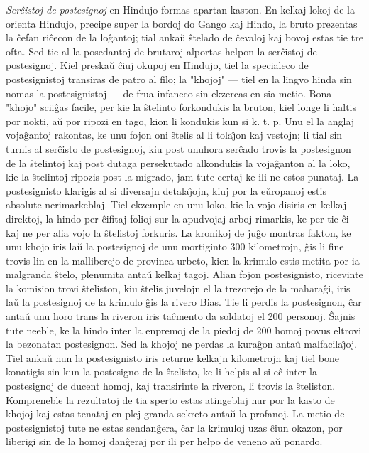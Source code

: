 \emph{Ser\^cistoj de postesignoj} en Hindujo formas apartan kaston.
En kelkaj lokoj de la orienta Hindujo, precipe super la bordoj do
Gango kaj Hindo, la bruto prezentas la \^cefan ri\^cecon de la
lo\^gantoj; tial anka\u u \^stelado de \^cevaloj kaj bovoj estas tie
tre ofta. Sed tie al la posedantoj de brutaroj alportas helpon la
ser\^cistoj de postesignoj. Kiel preska\u u \^ciuj okupoj en
Hindujo, tiel la specialeco de postesignistoj transiras de patro al
filo; la "khojoj" --- tiel en la lingvo hinda sin nomas la
postesignistoj --- de frua infaneco sin ekzercas en sia metio. Bona
"khojo" scii\^gas facile, per kie la \^stelinto forkondukis la
bruton, kiel longe li haltis por nokti, a\u u por ripozi en tago,
kion li kondukis kun si k. t. p. Unu el la anglaj voja\^gantoj
rakontas, ke unu fojon oni \^stelis al li tola\^{\j}on kaj vestojn;
li tial sin turnis al ser\^cisto de postesignoj, kiu post unuhora
ser\^cado trovis la postesignon de la \^stelintoj kaj post dutaga
persekutado alkondukis la voja\^ganton al la loko, kie la
\^stelintoj ripozis post la migrado, jam tute certaj ke ili ne estos
punataj. La postesignisto klarigis al si diversajn detala\^{\j}ojn,
kiuj por la e\u uropanoj estis absolute nerimarkeblaj. Tiel ekzemple
en unu loko, kie la vojo disiris en kelkaj direktoj, la hindo per
\^cifitaj folioj sur la apudvojaj arboj rimarkis, ke per tie \^ci
kaj ne per alia vojo la \^stelistoj forkuris. La kronikoj de ju\^go
montras fakton, ke unu khojo iris la\u u la postesignoj de unu
mortiginto 300 kilometrojn, \^gis li fine trovis lin en la
malliberejo de provinca urbeto, kien la krimulo estis metita por ia
malgranda \^stelo, plenumita anta\u u kelkaj tagoj. Alian fojon
postesignisto, ricevinte la komision trovi \^steliston, kiu \^stelis
juvelojn el la trezorejo de la mahara\^gi, iris la\u u la
postesignoj de la krimulo \^gis la rivero Bias. Tie li perdis la
postesignon, \^car anta\u u unu horo trans la riveron iris
ta\^cmento da soldatoj el 200 personoj. \^Sajnis tute neeble, ke la
hindo inter la enpremoj de la piedoj de 200 homoj povus eltrovi la
bezonatan postesignon. Sed la khojoj ne perdas la kura\^gon anta\u u
malfacila\^{\j}oj. Tiel anka\u u nun la postesignisto iris returne
kelkajn kilometrojn kaj tiel bone konatigis sin kun la postesigno de
la \^stelisto, ke li helpis al si e\^c inter la postesignoj de
ducent homoj, kaj transirinte la riveron, li trovis la \^steliston.
Kompreneble la rezultatoj de tia sperto estas atingeblaj nur por la
kasto de khojoj kaj estas tenataj en plej granda sekreto anta\u u la
profanoj. La metio de postesignistoj tute ne estas sendan\^gera,
\^car la krimuloj uzas \^ciun okazon, por liberigi sin de la homoj
dan\^geraj por ili per helpo de veneno a\u u ponardo.

